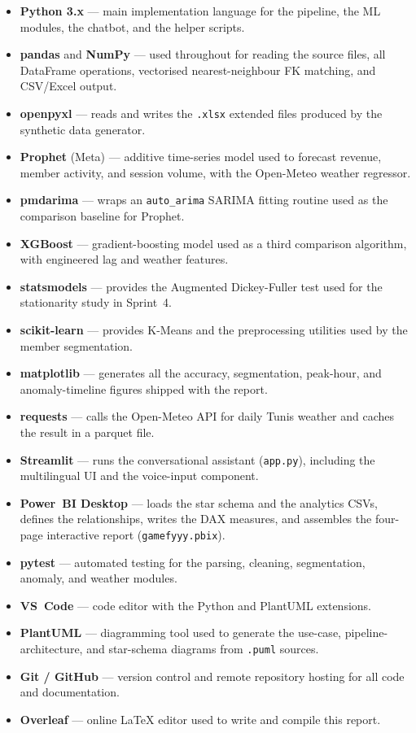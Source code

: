 \documentclass[12pt, a4paper]{report}
\begin{document}
\begin{itemize}
  \item \textbf{Python 3.x} — main implementation language for the pipeline,
        the ML modules, the chatbot, and the helper scripts.
  \item \textbf{pandas} and \textbf{NumPy} — used throughout for reading the
        source files, all DataFrame operations, vectorised nearest-neighbour
        FK matching, and CSV/Excel output.
  \item \textbf{openpyxl} — reads and writes the \texttt{.xlsx} extended files
        produced by the synthetic data generator.
  \item \textbf{Prophet} (Meta) — additive time-series model used to forecast
        revenue, member activity, and session volume, with the Open-Meteo
        weather regressor.
  \item \textbf{pmdarima} — wraps an \texttt{auto\_arima} SARIMA fitting
        routine used as the comparison baseline for Prophet.
  \item \textbf{XGBoost} — gradient-boosting model used as a third
        comparison algorithm, with engineered lag and weather features.
  \item \textbf{statsmodels} — provides the Augmented Dickey-Fuller test
        used for the stationarity study in Sprint~4.
  \item \textbf{scikit-learn} — provides K-Means and the preprocessing
        utilities used by the member segmentation.
  \item \textbf{matplotlib} — generates all the accuracy, segmentation,
        peak-hour, and anomaly-timeline figures shipped with the report.
  \item \textbf{requests} — calls the Open-Meteo API for daily Tunis weather
        and caches the result in a parquet file.
  \item \textbf{Streamlit} — runs the conversational assistant
        (\texttt{app.py}), including the multilingual UI and the voice-input
        component.
  \item \textbf{Power~BI Desktop} — loads the star schema and the analytics
        CSVs, defines the relationships, writes the DAX measures, and assembles
        the four-page interactive report (\texttt{gamefyyy.pbix}).
  \item \textbf{pytest} — automated testing for the parsing, cleaning,
        segmentation, anomaly, and weather modules.
  \item \textbf{VS~Code} — code editor with the Python and PlantUML extensions.
  \item \textbf{PlantUML} — diagramming tool used to generate the use-case,
        pipeline-architecture, and star-schema diagrams from
        \texttt{.puml} sources.
  \item \textbf{Git / GitHub} — version control and remote repository hosting
        for all code and documentation.
  \item \textbf{Overleaf} — online \LaTeX{} editor used to write and compile
        this report.
\end{itemize}
\end{document}
